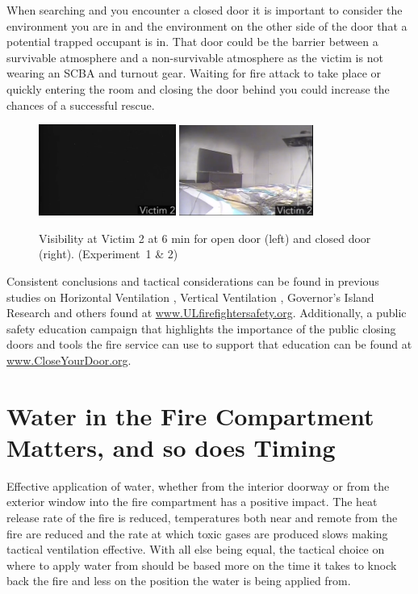 \documentclass[12pt,oneside]{book}
\begin{document}
When searching and you encounter a closed door it is important to consider the environment you are in and the environment on the other side of the door that a potential trapped occupant is in.  That door could be the barrier between a survivable atmosphere and a non-survivable atmosphere as the victim is not wearing an SCBA and turnout gear.  Waiting for fire attack to take place or quickly entering the room and closing the door behind you could increase the chances of a successful rescue.

\begin{figure}[H]
\centering
\includegraphics[width=0.4\textwidth]{../0_Images/Tactical_Considerations/Closed_Door/Experiment_1_Vic_2_600sec.png}
\includegraphics[width=0.39\textwidth]{../0_Images/Tactical_Considerations/Closed_Door/Experiment_2_Vic_2_600sec.png} 
\caption[Visibility]{Visibility at Victim 2 at 6 min for open door (left) and closed door (right). (Experiment~1 \& 2)}
\label{fig:search_consideration_visibility}
\end{figure}

Consistent conclusions and tactical considerations can be found in previous studies on Horizontal Ventilation \cite{DHS2008}, Vertical Ventilation \cite{UL_VerticalVent}, Governor's Island Research and others found at \href{www.ULfirefightersafety.org}{www.ULfirefightersafety.org}. Additionally, a public safety education campaign that highlights the importance of the public closing doors and tools the fire service can use to support that education can be found at \href{www.CloseYourDoor.org}{www.CloseYourDoor.org}.  

\section{Water in the Fire Compartment Matters, and so does Timing} \label{tc:water_in_compartment_and_time}
Effective application of water, whether from the interior doorway or from the exterior window into the fire compartment has a positive impact. The heat release rate of the fire is reduced, temperatures both near and remote from the fire are reduced and the rate at which toxic gases are produced slows making tactical ventilation effective. With all else being equal, the tactical choice on where to apply water from should be based more on the time it takes to knock back the fire and less on the position the water is being applied from.
\end{document}
